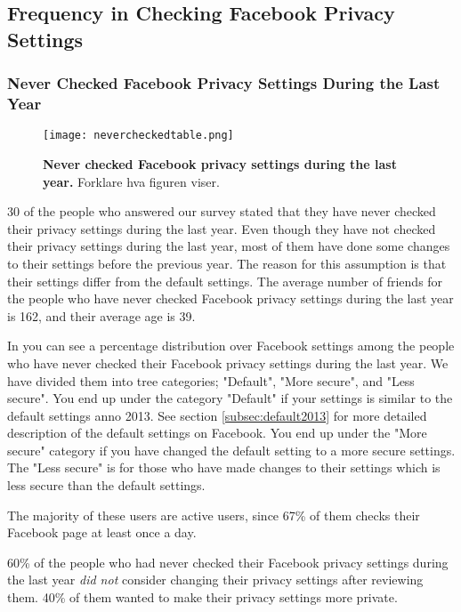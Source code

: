 \subsection{Frequency in Checking Facebook Privacy Settings}

\subsubsection{Never Checked Facebook Privacy Settings During the Last Year}

\begin{figure}[h!]
\centering
\texttt{[image: nevercheckedtable.png]}
\caption[Never checked Facebook privacy settings during the last year]{\textbf{Never checked Facebook privacy settings during the last year.} Forklare hva figuren viser.} 
\label{fig:neverchecked}
\end{figure}

30 of the people who answered our survey stated that they have never checked their privacy settings during the last year. Even though they have not checked their privacy settings during the last year, most of them have done some changes to their settings before the previous year. The reason for this assumption is that their settings differ from the default settings.  
The average number of friends for the people who have never checked Facebook privacy settings during the last year is 162, and their average age is 39. 

In  you can see a percentage distribution over Facebook settings among the people who have never checked their Facebook privacy settings during the last year. We have divided them into tree categories; "Default", "More secure", and "Less secure". You end up under the category "Default" if your settings is similar to the default settings anno 2013. See section \ref{subsec:default2013} for more detailed description of the default settings on Facebook. You end up under the "More secure" category if you have changed the default setting to a more secure settings. The "Less secure" is for those who have made changes to their settings which is less secure than the default settings. 

The majority of these users are active users, since 67\% of them checks their Facebook page at least once a day. 

60\% of the people who had never checked their Facebook privacy settings during the last year \textit{did not} consider changing their privacy settings after reviewing them. 40\% of them wanted to make their privacy settings more private. 

